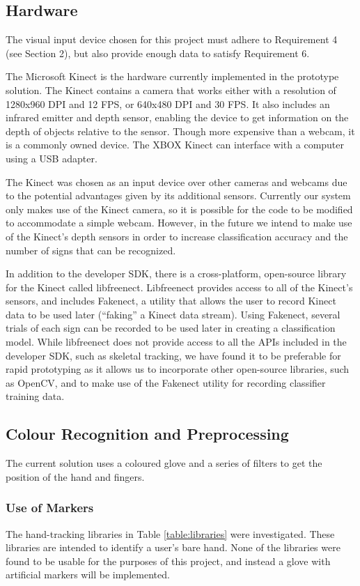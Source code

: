 \documentclass[12pt]{article}
\begin{document}
\subsection{Hardware}
The visual input device chosen for this project must adhere to Requirement 4 (see Section 2), but also provide enough data to satisfy Requirement 6. 

The Microsoft Kinect is the hardware currently implemented in the prototype solution. The Kinect contains a camera that works either with a resolution of 1280x960 DPI and 
12 FPS, or 640x480 DPI and 30 FPS. It also includes an infrared emitter and depth sensor, enabling the device to get information on the depth of objects relative to the sensor. Though more expensive than a webcam, it is a commonly owned device. The XBOX Kinect can interface with a computer using a USB adapter.

The Kinect was chosen as an input device over other cameras and webcams due to the potential advantages given by its additional sensors. Currently our system only makes use of the Kinect camera, so it is possible for the code to be modified to accommodate a simple webcam. However, in the future we intend to make use of the Kinect’s depth sensors in order to increase classification accuracy and the number of signs that can be recognized.

In addition to the developer SDK, there is a cross-platform, open-source library for the Kinect called libfreenect. Libfreenect provides access to all of the Kinect’s sensors, and includes Fakenect, a utility that allows the user to record Kinect data to be used later (“faking” a Kinect data stream). Using Fakenect, several trials of each sign can be recorded to be used later in creating a classification model. While libfreenect does not provide access to all the APIs included in the developer SDK, such as skeletal tracking, we have found it to be preferable for rapid prototyping as it allows us to incorporate other open-source libraries, such as OpenCV, and to make use of the Fakenect utility for recording classifier training data.

\subsection{Colour Recognition and Preprocessing}
The current solution uses a coloured glove and a series of filters to get the position of the hand and fingers. 

\subsubsection{Use of Markers}
The hand-tracking libraries in Table \ref{table:libraries} were investigated. These libraries are intended to identify a user’s bare hand. None of the libraries were found to be usable for the purposes of this project, and instead a glove with artificial markers will be implemented.
\end{document}
